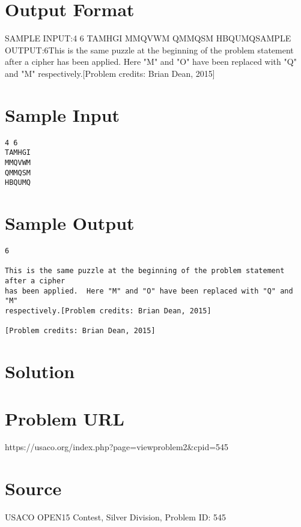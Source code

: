 \documentclass[12pt]{article}
\begin{document}
\section*{Output Format}
SAMPLE INPUT:4 6
TAMHGI
MMQVWM
QMMQSM
HBQUMQSAMPLE OUTPUT:6This is the same puzzle at the beginning of the problem statement after a cipher
has been applied.  Here "M" and "O" have been replaced with "Q" and "M"
respectively.[Problem credits: Brian Dean, 2015]

\section*{Sample Input}
\begin{verbatim}
4 6
TAMHGI
MMQVWM
QMMQSM
HBQUMQ
\end{verbatim}

\section*{Sample Output}
\begin{verbatim}
6

This is the same puzzle at the beginning of the problem statement after a cipher
has been applied.  Here "M" and "O" have been replaced with "Q" and "M"
respectively.[Problem credits: Brian Dean, 2015]

[Problem credits: Brian Dean, 2015]
\end{verbatim}

\section*{Solution}


\section*{Problem URL}
https://usaco.org/index.php?page=viewproblem2&cpid=545

\section*{Source}
USACO OPEN15 Contest, Silver Division, Problem ID: 545
\end{document}
